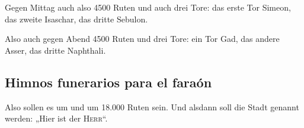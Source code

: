  Gegen Mittag auch also 4500 Ruten und auch drei Tore:
das erste Tor Simeon, das zweite Isaschar, das dritte Sebulon.

 Also auch gegen Abend 4500 Ruten und drei Tore: ein Tor
Gad, das andere Asser, das dritte Naphthali.

\hypertarget{himnos-funerarios-para-el-farauxf3n}{%
\subsection{Himnos funerarios para el
faraón}\label{himnos-funerarios-para-el-farauxf3n}}

 Also sollen es um und um 18.000 Ruten sein. Und alsdann
soll die Stadt genannt werden: „Hier ist der \textsc{Herr}``.
